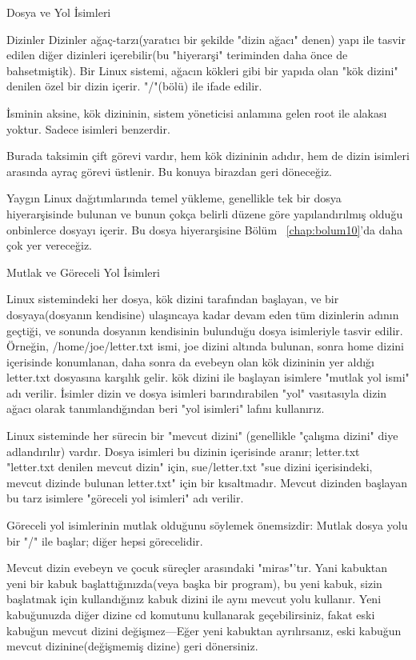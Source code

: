 \begin{section}{Dosya ve Yol İsimleri}
\begin{subsection}{Dizinler}
Dizinler ağaç-tarzı(yaratıcı bir şekilde "dizin ağacı"  denen) yapı ile tasvir edilen diğer dizinleri içerebilir(bu "hiyerarşi" teriminden daha önce de bahsetmiştik). Bir Linux sistemi, ağacın kökleri gibi bir yapıda olan "kök dizini" denilen özel bir dizin içerir.  "/"(bölü) ile ifade edilir.
	
İsminin aksine, kök dizininin, sistem yöneticisi anlamına gelen root ile alakası yoktur. Sadece isimleri benzerdir.
	
Burada taksimin çift görevi vardır, hem kök dizininin adıdır, hem de dizin isimleri arasında ayraç görevi üstlenir. Bu konuya birazdan geri döneceğiz.
	
Yaygın Linux dağıtımlarında temel yükleme, genellikle tek bir dosya hiyerarşisinde bulunan ve bunun çokça belirli düzene göre yapılandırılmış olduğu onbinlerce dosyayı içerir. Bu dosya hiyerarşisine Bölüm ~\ref{chap:bolum10}'da daha çok yer vereceğiz.
\end{subsection}
\begin{subsection}{Mutlak ve Göreceli Yol İsimleri}

Linux sistemindeki her dosya, kök dizini tarafından başlayan, ve bir dosyaya(dosyanın kendisine) ulaşıncaya kadar devam eden tüm dizinlerin adının geçtiği, ve sonunda dosyanın kendisinin bulunduğu dosya isimleriyle tasvir edilir. Örneğin, /home/joe/letter.txt ismi, joe dizini altında bulunan, sonra home dizini içerisinde konumlanan, daha sonra da evebeyn olan kök dizininin yer aldığı letter.txt dosyasına karşılık gelir. kök dizini ile başlayan isimlere "mutlak yol ismi" adı verilir. İsimler dizin ve dosya isimleri barındırabilen "yol" vasıtasıyla dizin ağacı olarak tanımlandığından beri "yol isimleri" lafını kullanırız.

Linux sisteminde her sürecin bir "mevcut dizini" (genellikle "çalışma dizini" diye adlandırılır) vardır. Dosya isimleri bu dizinin içerisinde aranır; letter.txt "letter.txt denilen mevcut dizin" için, sue/letter.txt "sue dizini içerisindeki, mevcut dizinde bulunan letter.txt" için bir kısaltmadır. Mevcut dizinden başlayan bu tarz isimlere "göreceli yol isimleri" adı verilir.
	
Göreceli yol isimlerinin mutlak olduğunu söylemek önemsizdir: Mutlak dosya yolu bir "/" ile başlar; diğer hepsi görecelidir.
	
Mevcut dizin evebeyn ve çocuk süreçler arasındaki "miras"'tır. Yani kabuktan yeni bir kabuk başlattığınızda(veya başka bir program), bu yeni kabuk, sizin başlatmak için kullandığınız kabuk dizini ile aynı mevcut yolu kullanır. Yeni kabuğunuzda diğer dizine cd komutunu kullanarak geçebilirsiniz, fakat eski kabuğun mevcut dizini değişmez—Eğer yeni kabuktan ayrılırsanız, eski kabuğun mevcut dizinine(değişmemiş dizine) geri dönersiniz. 
	

\end{subsection}
\end{section}

